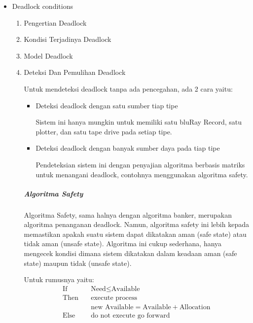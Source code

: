 \documentclass[12pt]{article}
\begin{document}
\begin{itemize}
    \item Deadlock conditions
    \begin{enumerate}
        \item Pengertian Deadlock
        \item Kondisi Terjadinya Deadlock
        \item Model Deadlock
        \item Deteksi Dan Pemulihan Deadlock
        \par Untuk mendeteksi deadlock tanpa ada pencegahan, ada 2 cara yaitu:
        \begin{itemize}
            \item Deteksi deadlock dengan satu sumber tiap tipe
            \begin{flushleft}
                Sistem ini hanya mungkin untuk memiliki satu bluRay Record, satu plotter, dan satu tape drive pada setiap tipe.
            \end{flushleft}
            \item Deteksi deadlock dengan banyak sumber daya pada tiap tipe
            \begin{flushleft}
                Pendeteksian sistem ini dengan penyajian algoritma berbasis matriks untuk menangani deadlock, contohnya menggunakan algoritma safety.
            \end{flushleft} 
        \end{itemize}

        \subparagraph{Algoritma Safety}
        \begin{flushleft}
            Algoritma Safety, sama halnya dengan algoritma banker, merupakan algoritma penanganan deadlock. Namun, algoritma safety ini lebih kepada memastikan apakah suatu sistem dapat dikatakan aman (safe state) atau tidak aman (unsafe state). Algoritma ini cukup sederhana, hanya mengecek kondisi dimana sistem dikatakan dalam keadaan aman (safe state) maupun tidak (unsafe state).
        \end{flushleft} 
        Untuk rumusnya yaitu:
        \begin{align*}
            \text{If} \quad & \text{Need} \leq \text{Available} \\ 
            \text{Then} \quad & \text{execute process} \\ 
            & \text{new Available} = \text{Available} + \text{Allocation} \\ 
            \text{Else} \quad & \text{do not execute go forward}
        \end{align*}
        

\end{enumerate}
\end{itemize}
\end{document}
